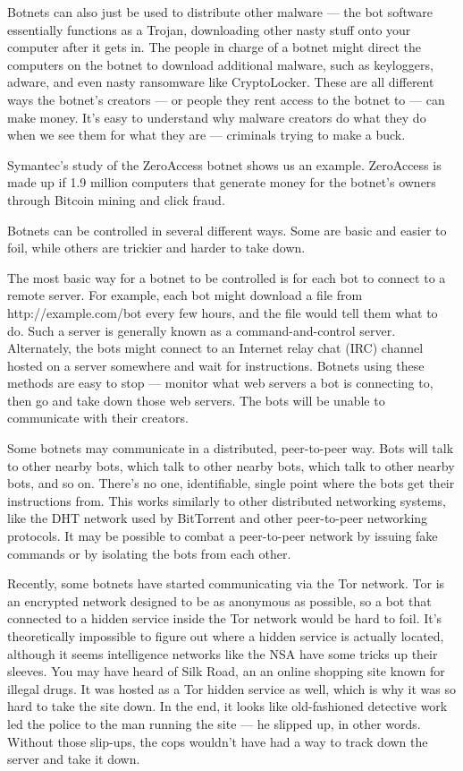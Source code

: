 Botnets can also just be used to distribute other malware — the bot software essentially functions as a Trojan, downloading other nasty stuff onto your computer after it gets in. The people in charge of a botnet might direct the computers on the botnet to download additional malware, such as keyloggers, adware, and even nasty ransomware like CryptoLocker. These are all different ways the botnet’s creators — or people they rent access to the botnet to — can make money. It’s easy to understand why malware creators do what they do when we see them for what they are — criminals trying to make a buck.

Symantec’s study of the ZeroAccess botnet shows us an example. ZeroAccess is made up if 1.9 million computers that generate money for the botnet’s owners through Bitcoin mining and click fraud.

Botnets can be controlled in several different ways. Some are basic and easier to foil, while others are trickier and harder to take down.

The most basic way for a botnet to be controlled is for each bot to connect to a remote server. For example, each bot might download a file from http://example.com/bot every few hours, and the file would tell them what to do. Such a server is generally known as a command-and-control server. Alternately, the bots might connect to an Internet relay chat (IRC) channel hosted on a server somewhere and wait for instructions. Botnets using these methods are easy to stop — monitor what web servers a bot is connecting to, then go and take down those web servers. The bots will be unable to communicate with their creators.

Some botnets may communicate in a distributed, peer-to-peer way. Bots will talk to other nearby bots, which talk to other nearby bots, which talk to other nearby bots, and so on. There’s no one, identifiable, single point where the bots get their instructions from. This works similarly to other distributed networking systems, like the DHT network used by BitTorrent and other peer-to-peer networking protocols. It may be possible to combat a peer-to-peer network by issuing fake commands or by isolating the bots from each other.

Recently, some botnets have started communicating via the Tor network. Tor is an encrypted network designed to be as anonymous as possible, so a bot that connected to a hidden service inside the Tor network would be hard to foil. It’s theoretically impossible to figure out where a hidden service is actually located, although it seems intelligence networks like the NSA have some tricks up their sleeves. You may have heard of Silk Road, an an online shopping site known for illegal drugs. It was hosted as a Tor hidden service as well, which is why it was so hard to take the site down. In the end, it looks like old-fashioned detective work led the police to the man running the site — he slipped up, in other words. Without those slip-ups, the cops wouldn’t have had a way to track down the server and take it down.

